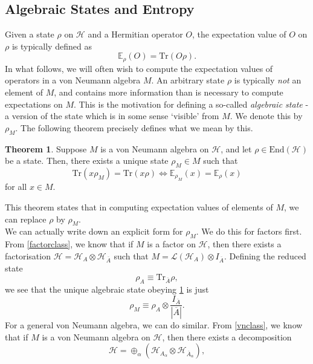 \documentclass[12pt,a4paper]{report}
\numberwithin{equation}{section}
\newcommand{\ol}[1]{\overline{#1}}
\newcommand{\tr}{\text{Tr}}
\theoremstyle{definition}
\theoremstyle{theorem}
\newtheorem{theorem}{Theorem}[section]
\theoremstyle{theorem}
\theoremstyle{example}
\theoremstyle{definition}
\begin{document}
\subsection{Algebraic States and Entropy}
Given a state $\rho$ on $\mathcal{H}$ and a Hermitian operator $O$, the expectation value of $O$ on $\rho$ is typically defined as
\begin{equation}
	\mathbb{E}_{\rho}(O)=\tr(O\rho).
\end{equation}
In what follows, we will often wish to compute the expectation values of operators in a von Neumann algebra $M$. An arbitrary state $\rho$ is typically \textit{not} an element of $M$, and contains more information than is necessary to compute expectations on $M$. This is the motivation for defining a so-called \textit{algebraic state} - a version of the state which is in some sense `visible' from $M$. We denote this by $\rho_{M}$. The following theorem precisely defines what we mean by this.
\begin{theorem}\label{algst}
	Suppose $M$ is a von Neumann algebra on $\mathcal{H}$, and let $\rho\in\text{End}(\mathcal{H})$ be a state. Then, there exists a unique state $\rho_{M}\in M$ such that
	\begin{equation}
		\tr(x\rho_{M})=\tr(x\rho)\iff \mathbb{E}_{\rho_{M}}(x)=\mathbb{E}_{\rho}(x)
	\end{equation}
	for all $x\in M$.
\end{theorem}
This theorem states that in computing expectation values of elements of $M$, we can replace $\rho$ by $\rho_{M}$.\\
We can actually write down an explicit form for $\rho_{M}$. We do this for factors first. From \ref{factorclass}, we know that if $M$ is a factor on $\mathcal{H}$, then there exists a factorisation $\mathcal{H}=\mathcal{H}_{A}\otimes\mathcal{H}_{\ol{A}}$ such that $M=\mathcal{L}(\mathcal{H}_{A})\otimes I_{\ol{A}}$. Defining the reduced state
\begin{equation}
	\rho_{A}\equiv\tr_{\ol{A}}\rho,
\end{equation} 
we see that the unique algebraic state obeying \ref{algst} is just
\begin{equation}\label{factalg}
	\rho_{M}\equiv\rho_{A}\otimes\frac{I_{\ol{A}}}{|\ol{A}|}.
\end{equation}
For a general von Neumann algebra, we can do similar. From \ref{vnclass}, we know that if $M$ is a von Neumann algebra on $\mathcal{H}$, then there exists a decomposition
\begin{equation}\label{decomp1}
	\mathcal{H}=\oplus_{\alpha}(\mathcal{H}_{A_{\alpha}}\otimes\mathcal{H}_{\ol{A}_{\alpha}}),
\end{equation}
\end{document}
